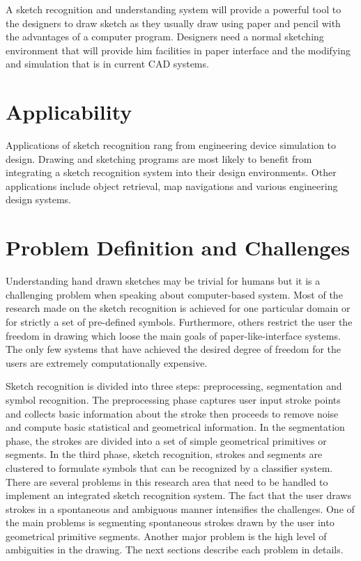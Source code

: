  A sketch recognition and understanding system will provide a powerful tool to the designers to draw sketch as they usually draw using paper and pencil with the advantages of a computer program. Designers need a normal sketching environment that will provide him facilities in paper interface and the modifying and simulation that is in current CAD systems. 
 
\section{Applicability }
Applications of sketch recognition rang from engineering device simulation to design. Drawing and sketching programs are most likely to benefit from integrating a sketch recognition system into their design environments. Other applications include object retrieval, map navigations and various engineering design systems.

\section{Problem Definition and Challenges}
\label{sec:ProblemsAndChallenges}

Understanding hand drawn sketches may be trivial for humans but it is a challenging problem when speaking about computer-based system. Most of the research made on the sketch recognition is achieved for one particular domain or for strictly a set of pre-defined symbols\cite{Vibratory8,physicalmeaning6}. Furthermore, others restrict the user the freedom in drawing which loose the main goals of paper-like-interface systems\cite{gestureexample12,aideddesgin22,sketchinginterfaces2}. The only few systems that have achieved the desired degree of freedom for the users are extremely computationally expensive\cite{EfficientAbstract39,SketchRead2007}.

Sketch recognition is divided into three steps: preprocessing, segmentation and symbol recognition. The preprocessing phase captures user input stroke points and collects basic information about the stroke then proceeds to remove noise and compute basic statistical and geometrical information. In the segmentation phase, the strokes are divided into a set of simple geometrical primitives or segments. In the third phase, sketch recognition, strokes and segments are clustered to formulate symbols that can be recognized by a classifier system.
There are several problems in this research area that need to be handled to implement an integrated sketch recognition system. The fact that the user draws strokes in a spontaneous and ambiguous manner intensifies the challenges. One of the main problems is segmenting spontaneous strokes drawn by the user into geometrical primitive segments. Another major problem is the high level of ambiguities in the drawing. The next sections describe each problem in details. 


